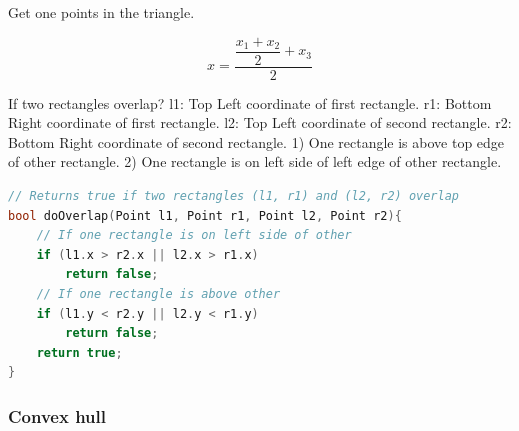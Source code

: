 \documentclass[a4paper,11pt,twoside]{book}
\begin{document}
	\par Get one points in the triangle. 

\[
x = \dfrac{\dfrac{x_{1}+x_{2}}{2}+x_{3}}{2}
\]

\par If two rectangles overlap? l1: Top Left coordinate of first rectangle. r1: Bottom Right coordinate of first rectangle. l2: Top Left coordinate of second rectangle. r2: Bottom Right coordinate of second rectangle. 1) One rectangle is above top edge of other rectangle. 2) One rectangle is on left side of left edge of other rectangle.

\begin{lstlisting}[frame=single, language=c++]
// Returns true if two rectangles (l1, r1) and (l2, r2) overlap
bool doOverlap(Point l1, Point r1, Point l2, Point r2){
    // If one rectangle is on left side of other
    if (l1.x > r2.x || l2.x > r1.x)
        return false;
    // If one rectangle is above other
    if (l1.y < r2.y || l2.y < r1.y)
        return false;
    return true;
}
\end{lstlisting}


\subsubsection{Convex hull}
\end{document}
